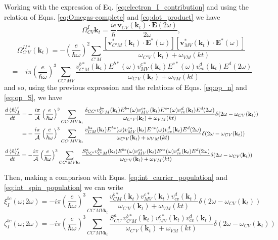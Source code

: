 \documentclass{article}
\newcommand{\kt}{\mathbf{k}_{t}}
\newcommand{\dw}{\delta(2\omega - \omega_{CV}(\kt))}
\begin{document}
Working with the expression of Eq. \eqref{eq:electron_I_contribution} and using
the relation of Eqns. \eqref{eq:Omegas-complete} and  \eqref{eq:dot_product} we
have
\begin{equation*}
\Omega^{I}_{CV}{\kt} = \frac{ie}{\hbar}
\frac{\mathbf{v}_{CV}(\kt) \cdot \mathbf{E}(2\omega)}{2\omega} ,
\end{equation*}
\begin{equation*}
\Omega^{II*}_{C'V}(\kt) = - \left(\frac{e}{\hbar\omega}\right)^{2}
\sum_{C'M} \frac{[\mathbf{v}^{*}_{C'M}(\kt) \cdot \mathbf{E}^{*}(\omega)]
[\mathbf{v}^{*}_{MV}(\kt)\cdot\mathbf{E}^{*}(\omega)]}{\omega_{C'V}(\kt)+\omega_{VM}(kt)}
\end{equation*}
\begin{equation}
[\Omega^{II*}_{C'V}(\kt) \Omega^{I}_{CV}{\kt}] =  -i \pi \left( \frac{e}{\hbar\omega} 
\right)^{3} \sum_{CC'MV} \frac{v^{b*}_{C'M}(\kt) E^{b*}(\omega)
v^{c*}_{MV}(\kt) E^{c*}(\omega) v^{d}_{cv}(\kt) E^{d}(2\omega) }
{\omega_{C'V}(\kt)+\omega_{VM}(kt)}
\end{equation}
and so, using the previous expression and the relations of Eqns. \eqref{eq:op_n} and
\eqref{eq:op_S}, we have 
\begin{equation}
\begin{split}
\frac{d\ev*{\hat{n}}^{e}_{I}}{dt} =&
- \frac{i \pi}{\mathcal{A}} \left( \frac{e}{\hbar\omega} 
\right)^{3} \sum_{CC'MV\kt} \frac{\delta_{CC'}v^{b*}_{C'M}(\kt) E^{b*}(\omega)
v^{c*}_{MV}(\kt) E^{c*}(\omega) v^{d}_{cv}(\kt) E^{d}(2\omega) }
{\omega_{C'V}(\kt)+\omega_{VM}(kt)} \dw \\
=& - \frac{i \pi}{\mathcal{A}} \left( \frac{e}{\hbar\omega} 
\right)^{3} \sum_{CC'MV\kt} \frac{v^{b*}_{CM}(\kt) E^{b*}(\omega)
v^{c*}_{MV}(\kt) E^{c*}(\omega) v^{d}_{cv}(\kt) E^{d}(2\omega) }
{\omega_{C'V}(\kt)+\omega_{VM}(kt)} \dw
\end{split}
\end{equation}
\begin{equation}
\begin{split}
\frac{d\ev*{\hat{n}}^{e}_{I}}{dt} &=
- \frac{i \pi}{\mathcal{A}} \left( \frac{e}{\hbar\omega} 
\right)^{3} \sum_{CC'MV\kt} \frac{S^{a}_{CC'}v^{b*}_{C'M}(\kt) E^{b*}(\omega)
v^{c*}_{MV}(\kt) E^{c*}(\omega) v^{d}_{cv}(\kt) E^{d}(2\omega) }
{\omega_{C'V}(\kt)+\omega_{VM}(kt)} \dw
\end{split}
\end{equation}

Then, making a comparison with Eqns. \eqref{eq:int_carrier_population} and 
\eqref{eq:int_spin_population} we can write 
\begin{equation*}
\xi^{bc}_{I}(\omega;2\omega) =  - i \pi \left( \frac{e}{\hbar\omega} 
\right)^{3} \sum_{CC'MV\kt} \frac{v^{b*}_{CM}(\kt)
v^{c*}_{MV}(\kt) v^{d}_{cv}(\kt) }
{\omega_{C'V}(\kt)+\omega_{VM}(kt)} \dw
\end{equation*}
\begin{equation*}
\zeta^{bc}_{I}(\omega;2\omega) = - i \pi \left( \frac{e}{\hbar\omega} 
\right)^{3} \sum_{CC'MV\kt} \frac{S^{a}_{CC'}v^{b*}_{C'M}(\kt)
v^{c*}_{MV}(\kt) v^{d}_{cv}(\kt) }
{\omega_{C'V}(\kt)+\omega_{VM}(kt)} \dw
\end{equation*}
\end{document}
